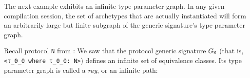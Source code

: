 \documentclass[../generics]{subfiles}
\begin{document}
The next example exhibits an infinite type parameter graph. In any given compilation session, the set of archetypes that are actually instantiated will form an arbitrarily large but finite subgraph of the generic signature's type parameter graph.

\begin{example}\label{protocol n graph}
Recall protocol \texttt{N} from :
We saw that the protocol generic signature $G_{\texttt{N}}$ (that is, \verb|<τ_0_0 where τ_0_0: N>|) defines an infinite set of equivalence classes. Its type parameter graph is called a \emph{ray}, or an infinite path:
\begin{center}
\end{center}
\end{example}
\end{document}
